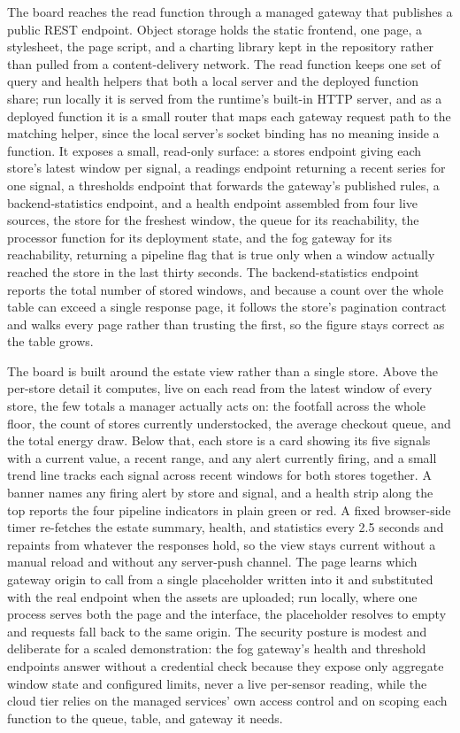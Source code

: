 \documentclass[conference]{IEEEtran}
\begin{document}
The board reaches the read function through a managed gateway that publishes a public REST endpoint. Object storage holds the static frontend, one page, a stylesheet, the page script, and a charting library kept in the repository rather than pulled from a content-delivery network. The read function keeps one set of query and health helpers that both a local server and the deployed function share; run locally it is served from the runtime's built-in HTTP server, and as a deployed function it is a small router that maps each gateway request path to the matching helper, since the local server's socket binding has no meaning inside a function. It exposes a small, read-only surface: a stores endpoint giving each store's latest window per signal, a readings endpoint returning a recent series for one signal, a thresholds endpoint that forwards the gateway's published rules, a backend-statistics endpoint, and a health endpoint assembled from four live sources, the store for the freshest window, the queue for its reachability, the processor function for its deployment state, and the fog gateway for its reachability, returning a pipeline flag that is true only when a window actually reached the store in the last thirty seconds. The backend-statistics endpoint reports the total number of stored windows, and because a count over the whole table can exceed a single response page, it follows the store's pagination contract and walks every page rather than trusting the first, so the figure stays correct as the table grows.

The board is built around the estate view rather than a single store. Above the per-store detail it computes, live on each read from the latest window of every store, the few totals a manager actually acts on: the footfall across the whole floor, the count of stores currently understocked, the average checkout queue, and the total energy draw. Below that, each store is a card showing its five signals with a current value, a recent range, and any alert currently firing, and a small trend line tracks each signal across recent windows for both stores together. A banner names any firing alert by store and signal, and a health strip along the top reports the four pipeline indicators in plain green or red. A fixed browser-side timer re-fetches the estate summary, health, and statistics every 2.5 seconds and repaints from whatever the responses hold, so the view stays current without a manual reload and without any server-push channel. The page learns which gateway origin to call from a single placeholder written into it and substituted with the real endpoint when the assets are uploaded; run locally, where one process serves both the page and the interface, the placeholder resolves to empty and requests fall back to the same origin. The security posture is modest and deliberate for a scaled demonstration: the fog gateway's health and threshold endpoints answer without a credential check because they expose only aggregate window state and configured limits, never a live per-sensor reading, while the cloud tier relies on the managed services' own access control and on scoping each function to the queue, table, and gateway it needs.
\end{document}
